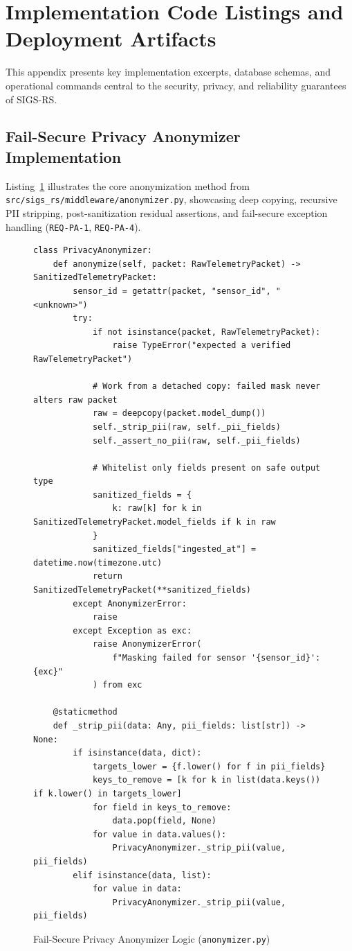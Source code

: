 \section{Implementation Code Listings and Deployment Artifacts}

This appendix presents key implementation excerpts, database schemas, and operational commands central to the security, privacy, and reliability guarantees of SIGS-RS.

\subsection{Fail-Secure Privacy Anonymizer Implementation}
Listing~\ref{lst:anonymizer_impl} illustrates the core anonymization method from \texttt{src/sigs\_rs/middleware/anonymizer.py}, showcasing deep copying, recursive PII stripping, post-sanitization residual assertions, and fail-secure exception handling (\texttt{REQ-PA-1}, \texttt{REQ-PA-4}).

\begin{figure}[H]
\centering
\begin{minipage}{0.95\linewidth}
\begin{verbatim}
class PrivacyAnonymizer:
    def anonymize(self, packet: RawTelemetryPacket) -> SanitizedTelemetryPacket:
        sensor_id = getattr(packet, "sensor_id", "<unknown>")
        try:
            if not isinstance(packet, RawTelemetryPacket):
                raise TypeError("expected a verified RawTelemetryPacket")

            # Work from a detached copy: failed mask never alters raw packet
            raw = deepcopy(packet.model_dump())
            self._strip_pii(raw, self._pii_fields)
            self._assert_no_pii(raw, self._pii_fields)

            # Whitelist only fields present on safe output type
            sanitized_fields = {
                k: raw[k] for k in SanitizedTelemetryPacket.model_fields if k in raw
            }
            sanitized_fields["ingested_at"] = datetime.now(timezone.utc)
            return SanitizedTelemetryPacket(**sanitized_fields)
        except AnonymizerError:
            raise
        except Exception as exc:
            raise AnonymizerError(
                f"Masking failed for sensor '{sensor_id}': {exc}"
            ) from exc

    @staticmethod
    def _strip_pii(data: Any, pii_fields: list[str]) -> None:
        if isinstance(data, dict):
            targets_lower = {f.lower() for f in pii_fields}
            keys_to_remove = [k for k in list(data.keys()) if k.lower() in targets_lower]
            for field in keys_to_remove:
                data.pop(field, None)
            for value in data.values():
                PrivacyAnonymizer._strip_pii(value, pii_fields)
        elif isinstance(data, list):
            for value in data:
                PrivacyAnonymizer._strip_pii(value, pii_fields)
\end{verbatim}
\end{minipage}
\caption{Fail-Secure Privacy Anonymizer Logic (\texttt{anonymizer.py})}
\label{lst:anonymizer_impl}
\end{figure}

